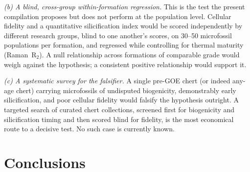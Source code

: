 \documentclass[11pt]{article}
\begin{document}
\textit{(b) A blind, cross-group within-formation regression.} This is the test the present
compilation proposes but does not perform at the population level. Cellular fidelity and a
quantitative silicification index would be scored independently by different research groups, blind
to one another's scores, on 30--50 microfossil populations per formation, and regressed while
controlling for thermal maturity (Raman~R$_2$). A null relationship across formations of comparable
grade would weigh against the hypothesis; a consistent positive relationship would support it.

\textit{(c) A systematic survey for the falsifier.} A single pre-GOE chert (or indeed any-age chert)
carrying microfossils of undisputed biogenicity, demonstrably early silicification, and poor cellular
fidelity would falsify the hypothesis outright. A targeted search of curated chert collections,
screened first for biogenicity and silicification timing and then scored blind for fidelity, is the
most economical route to a decisive test. No such case is currently known.

\section{Conclusions}
\end{document}
